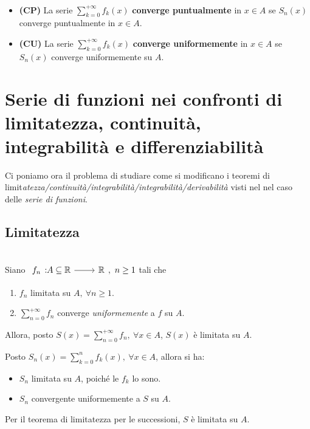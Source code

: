 \begin{define}~{}\\
	\begin{itemize}
		\item \textbf{(CP)} La serie $\displaystyle\sum_{k=0}^{+\infty}f_k\left(x\right)$ \textbf{converge puntualmente} in $x\in A$ se $S_n\left(x\right)$ converge puntualmente in $x\in A$.
		\item \textbf{(CU)} La serie $\displaystyle\sum_{k=0}^{+\infty}f_k\left(x\right)$ \textbf{converge uniformemente} in $x\in A$ se $S_n\left(x\right)$ converge uniformemente su $A$.
	\end{itemize}
\end{define}
\section{Serie di funzioni nei confronti di limitatezza, continuità, integrabilità e differenziabilità}
Ci poniamo ora il problema di studiare come si modificano i teoremi di limit\textit{atezza/continuità/integrabilità/integrabilità/derivabilità} visti nel  nel caso delle \textit{serie di funzioni}.
\subsection{Limitatezza}
\begin{theorema}~{}\\
	Siano $\displaystyle \funz{f_n}{A\subseteq\realset}{\realset},\ n\geq 1$ tali che
	\begin{enumerate}
		\item $f_n$ limitata su $A,\ \forall n\geq 1$.
		\item $\displaystyle\sum_{n=0}^{+\infty}f_n$ converge \textit{uniformemente} a $f$ su $A$.
	\end{enumerate}
	Allora, posto $\displaystyle S\left(x\right)=\sum_{n=0}^{+\infty}f_n,\ \forall x\in A$, $S\left(x\right)$ è limitata su $A$.
\end{theorema}
\begin{demonstration}
	Posto $\displaystyle S_n\left(x\right)=\sum_{k=0}^{n}f_k\left(x\right),\ \forall x\in A$, allora si ha:
	\begin{itemize}
		\item $S_n$ limitata su $A$, poiché le $f_k$ lo sono.
		\item $S_n$ convergente uniformemente a $S$ su $A$.
	\end{itemize}
	Per il teorema di limitatezza per le successioni, $S$ è limitata su $A$.
\end{demonstration}
